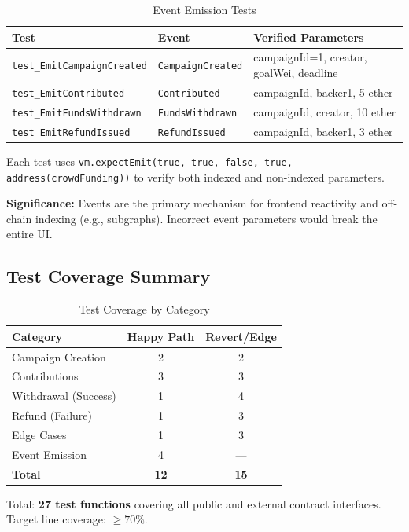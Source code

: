 \begin{table}[H]
\centering
\caption{Event Emission Tests}
\label{tab:events_tests}
\begin{tabularx}{\textwidth}{l l X}
\toprule
\textbf{Test} & \textbf{Event} & \textbf{Verified Parameters} \\
\midrule
\texttt{test\_EmitCampaignCreated}   & \texttt{CampaignCreated}    & campaignId=1, creator, goalWei, deadline \\
\texttt{test\_EmitContributed}       & \texttt{Contributed}        & campaignId, backer1, 5 ether \\
\texttt{test\_EmitFundsWithdrawn}    & \texttt{FundsWithdrawn}     & campaignId, creator, 10 ether \\
\texttt{test\_EmitRefundIssued}      & \texttt{RefundIssued}       & campaignId, backer1, 3 ether \\
\bottomrule
\end{tabularx}
\end{table}

Each test uses \texttt{vm.expectEmit(true, true, false, true, address(crowdFunding))} to verify both indexed and non-indexed parameters.

\textbf{Significance:} Events are the primary mechanism for frontend reactivity and off-chain indexing (e.g., subgraphs). Incorrect event parameters would break the entire UI.

\subsection{Test Coverage Summary}

\begin{table}[H]
\centering
\caption{Test Coverage by Category}
\label{tab:coverage}
\begin{tabular}{l c c}
\toprule
\textbf{Category} & \textbf{Happy Path} & \textbf{Revert/Edge} \\
\midrule
Campaign Creation     & 2 & 2 \\
Contributions         & 3 & 3 \\
Withdrawal (Success)  & 1 & 4 \\
Refund (Failure)      & 1 & 3 \\
Edge Cases            & 1 & 3 \\
Event Emission        & 4 & --- \\
\midrule
\textbf{Total}        & \textbf{12} & \textbf{15} \\
\bottomrule
\end{tabular}
\end{table}

Total: \textbf{27 test functions} covering all public and external contract interfaces. Target line coverage: $\geq 70\%$.
